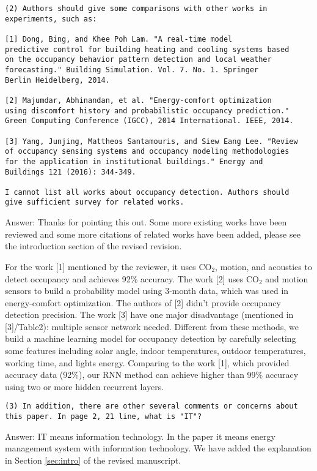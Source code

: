 \begin{verbatim}
(2) Authors should give some comparisons with other works in
experiments, such as:

[1] Dong, Bing, and Khee Poh Lam. "A real-time model
predictive control for building heating and cooling systems based
on the occupancy behavior pattern detection and local weather
forecasting." Building Simulation. Vol. 7. No. 1. Springer
Berlin Heidelberg, 2014.

[2] Majumdar, Abhinandan, et al. "Energy-comfort optimization
using discomfort history and probabilistic occupancy prediction."
Green Computing Conference (IGCC), 2014 International. IEEE, 2014.

[3] Yang, Junjing, Mattheos Santamouris, and Siew Eang Lee. "Review
of occupancy sensing systems and occupancy modeling methodologies
for the application in institutional buildings." Energy and
Buildings 121 (2016): 344-349.

I cannot list all works about occupancy detection. Authors should
give sufficient survey for related works.
\end{verbatim}

Answer:
Thanks for pointing this out. Some more existing works have been reviewed and some more citations of related works have been added, please see the introduction section of the revised revision. 

For the work [1] mentioned by the reviewer, it uses CO$_2$, motion, and acoustics to detect occupancy and achieves 92\% accuracy. The work [2] uses CO$_2$ and motion sensors to build a probability model using 3-month data, which was used in energy-comfort optimization. The authors of [2] didn't provide occupancy detection precision. The work [3] have one major disadvantage (mentioned in [3]/Table2): multiple sensor network needed. Different from these methods, we build a machine learning model for occupancy detection by carefully selecting some features including solar angle, indoor temperatures, outdoor temperatures, working time, and lights energy. Comparing to the work [1], which provided accuracy data (92\%), our RNN method can achieve higher than 99\% accuracy using two or more hidden recurrent layers.

\begin{verbatim}
(3) In addition, there are other several comments or concerns about
this paper. In page 2, 21 line, what is "IT"?
\end{verbatim}
Answer: IT means information technology. In the paper it means energy
management system with information technology. We have added the explanation in
Section \ref{sec:intro} of the revised manuscript.

